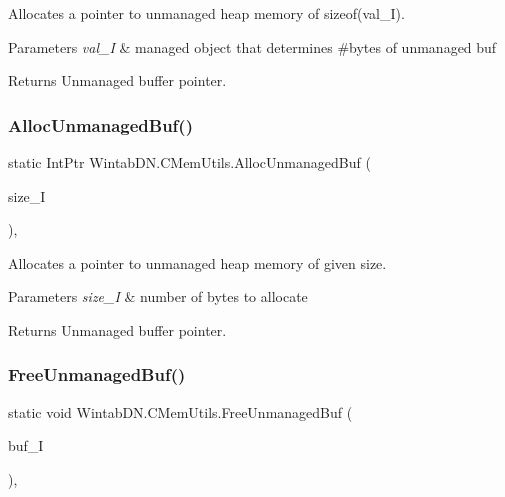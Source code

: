 Allocates a pointer to unmanaged heap memory of sizeof(val\+\_\+\+I). 


\begin{DoxyParams}{Parameters}
{\em val\+\_\+I} & managed object that determines \#bytes of unmanaged buf\\
\hline
\end{DoxyParams}
\begin{DoxyReturn}{Returns}
Unmanaged buffer pointer.
\end{DoxyReturn}
\mbox{\label{class_wintab_d_n_1_1_c_mem_utils_a040095d5e15e45e5e9c5c319a3acbd04}} 
\subsubsection{\texorpdfstring{Alloc\+Unmanaged\+Buf()}{AllocUnmanagedBuf()}\hspace{0.1cm}{\footnotesize\ttfamily [2/2]}}
{\footnotesize\ttfamily static Int\+Ptr Wintab\+D\+N.\+C\+Mem\+Utils.\+Alloc\+Unmanaged\+Buf (\begin{DoxyParamCaption}\item[{int}]{size\+\_\+I }\end{DoxyParamCaption})\hspace{0.3cm}{\ttfamily [inline]}, {\ttfamily [static]}}



Allocates a pointer to unmanaged heap memory of given size. 


\begin{DoxyParams}{Parameters}
{\em size\+\_\+I} & number of bytes to allocate\\
\hline
\end{DoxyParams}
\begin{DoxyReturn}{Returns}
Unmanaged buffer pointer.
\end{DoxyReturn}
\mbox{\label{class_wintab_d_n_1_1_c_mem_utils_a6a1fcfba4ce4ed260a86d87f80eac0d1}} 
\subsubsection{\texorpdfstring{Free\+Unmanaged\+Buf()}{FreeUnmanagedBuf()}}
{\footnotesize\ttfamily static void Wintab\+D\+N.\+C\+Mem\+Utils.\+Free\+Unmanaged\+Buf (\begin{DoxyParamCaption}\item[{Int\+Ptr}]{buf\+\_\+I }\end{DoxyParamCaption})\hspace{0.3cm}{\ttfamily [inline]}, {\ttfamily [static]}}



